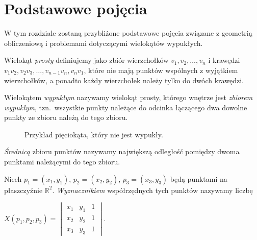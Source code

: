 \chapter{Podstawowe pojęcia}\label{chap:pojecia}
W tym rozdziale zostaną przybliżone podstawowe pojęcia związane
z geometrią obliczeniową i problemami dotyczącymi wielokątów
wypukłych.

\begin{definicja}
  Wielokąt \emph{prosty} definiujemy jako zbiór wierzchołków $v_1,
  v_2, \ldots, v_n$ i krawędzi $v_1v_2, v_2v_3, \dots, v_{n-1}v_n,
  v_{n}v_1$, które nie mają punktów wspólnych z wyjątkiem wierzchołków,
  a ponadto każdy wierzchołek należy tylko do dwóch krawędzi.
\end{definicja}

\begin{definicja}
  Wielokątem \emph{wypukłym} nazywamy wielokąt prosty, którego wnętrze
  jest \emph{zbiorem wypukłym}, tzn.\ wszystkie punkty należące do
  odcinka łączącego dwa dowolne punkty ze zbioru należą do tego
  zbioru.
\end{definicja}

\begin{figure}[htb]
  \centering
  \caption{Przykład pięciokąta, który nie jest wypukły.}
\end{figure}

\begin{definicja}
  \emph{Średnicą} zbioru punktów nazywamy największą odległość
  pomiędzy dwoma punktami należącymi do tego zbioru.
\end{definicja}

\begin{definicja}
  Niech $p_{1}=(x_{1},y_{1})$, $p_{2}=(x_{2},y_{2})$,
  $p_{3}=(x_{3},y_{3})$ będą punktami na płaszczyźnie
  $\mathbb{R}^2$. \emph{Wyznacznikiem} współrzędnych tych punktów
  nazywamy liczbę

  \begin{center}
    \begin{math}
      X(p_1, p_2, p_3) =
      \begin{vmatrix}
        x_1 & y_1 & 1 \\
        x_2 & y_2 & 1 \\
        x_3 & y_3 & 1
      \end{vmatrix}
      .
    \end{math}
  \end{center}
\end{definicja}

